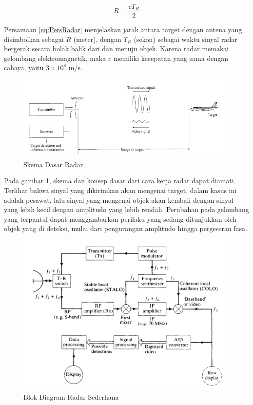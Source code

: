 \begin{equation}
	R = \frac{cT_{R}}{2}
	\label{eq:PersRadar}
\end{equation}

Persamaan \ref{eq:PersRadar} menjelaskan jarak antara target dengan antena yang disimbolkan sebagai $R$ (meter), dengan $T_{R}$ (sekon) sebagai waktu sinyal radar bergerak secara bolak balik dari dan menuju objek. Karena radar memakai gelombang elektromagnetik, maka $c$ memiliki kecepatan yang sama dengan cahaya, yaitu $3 \times 10 ^{8} $ m/s.

\begin{figure}
	\begin{center}
		\includegraphics[scale=0.3]{pics/bab2/skemaradar.png} 
		\caption[Skema Dasar Radar]{{Skema Dasar Radar} \cite{Skolnik2001}}
		\label{pic:skemaRadar}
	\end{center}
\end{figure}

Pada gambar \ref{pic:skemaRadar}, skema dan konsep dasar dari cara kerja radar dapat diamati. Terlihat bahwa sinyal yang dikirimkan akan mengenai target, dalam kasus ini adalah pesawat, lalu sinyal yang mengenai objek akan kembali dengan sinyal yang lebih kecil dengan amplitudo yang lebih rendah. Perubahan pada gelombang yang terpantul dapat menggambarkan perilaku yang sedang ditunjukkan oleh objek yang di deteksi, mulai dari pengurangan amplitudo hingga pergeseran fasa.

\begin{figure}
	\begin{center}
		\includegraphics[scale=0.32]{pics/bab2/blokdiagram.png} 
		\caption[Blok Diagram Radar]{{Blok Diagram Radar Sederhana \cite{Kingsley1999}}}
		\label{pic:blokdiagram}
	\end{center}
\end{figure}


